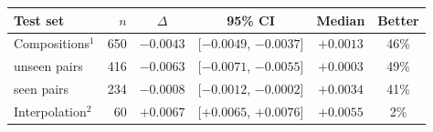 \setlength{\tabcolsep}{2pt}
\begin{tabular}{lrcccc}
\toprule
Test set & $n$ & $\Delta$ & 95\% CI & Median & Better \\
\midrule
Compositions$^{1}$ & 650 & $-0.0043$ & [$-0.0049$, $-0.0037$] & $+0.0013$ & 46\% \\
\quad unseen pairs & 416 & $-0.0063$ & [$-0.0071$, $-0.0055$] & $+0.0003$ & 49\% \\
\quad seen pairs & 234 & $-0.0008$ & [$-0.0012$, $-0.0002$] & $+0.0034$ & 41\% \\
Interpolation$^{2}$ & 60 & $+0.0067$ & [$+0.0065$, $+0.0076$] & $+0.0055$ & 2\% \\
\bottomrule
\end{tabular}
